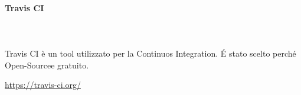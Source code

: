 		\paragraph{Travis CI} \mbox{}\\ \mbox{}\\
		Travis CI è un tool utilizzato per la Continuos Integration\glo. \'E stato scelto perché Open-Source\glosp e gratuito.
		\newline
		\centerline{\url{https://travis-ci.org/}}
		\begin{comment}
			\begin{figure}[H]
			\texttt{[image: res/images/""]}
			\caption{Software per la codifica}
			\end{figure} 
		\end{comment}
